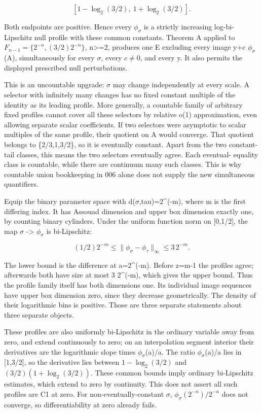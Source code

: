\documentclass[
  11pt,
]{article}
\theoremstyle{remark}\newtheorem{remark}[theorem]{Remark}
\begin{document}
\[
[1-\log_2(3/2),\ 1+\log_2(3/2)].
\]

Both endpoints are positive. Hence every \(\phi_\sigma\) is a strictly
increasing log-bi-Lipschitz null profile with these common constants.
Theorem A applied to \(F_{n-1}=\{2^{-n},(3/2)2^{-n}\}\),
n\textgreater=2, produces one E excluding every image y+c
\(\phi_\sigma\)(A), simultaneously for every \(\sigma\), every
\(c\ne0\), and every y. It also permits the displayed prescribed null
perturbations.

This is an uncountable upgrade: \(\sigma\) may change independently at
every scale. A selector with infinitely many changes has no fixed
constant multiple of the identity as its leading profile. More
generally, a countable family of arbitrary fixed profiles cannot cover
all these selectors by relative o(1) approximation, even allowing
separate scalar coefficients. If two selectors were asymptotic to scalar
multiples of the same profile, their quotient on A would converge. That
quotient belongs to \{2/3,1,3/2\}, so it is eventually constant. Apart
from the two constant-tail classes, this means the two selectors
eventually agree. Each eventual- equality class is countable, while
there are continuum many such classes. This is why countable union
bookkeeping in 006 alone does not supply the new simultaneous
quantifiers.

Equip the binary parameter space with d(\(\sigma\),tau)=2\^{}(-m), where
m is the first differing index. It has Assouad dimension and upper box
dimension exactly one, by counting binary cylinders. Under the uniform
function norm on {[}0,1/2{]}, the map \(\sigma\) -\textgreater{}
\(\phi_\sigma\) is bi-Lipschitz:

\[
(1/2)2^{-m}\le\|\phi_\sigma-\phi_\tau\|_\infty\le3\,2^{-m}.
\]

The lower bound is the difference at a=2\^{}(-m). Before z=m-1 the
profiles agree; afterwards both have size at most 3 2\^{}(-m), which
gives the upper bound. Thus the profile family itself has both
dimensions one. Its individual image sequences have upper box dimension
zero, since they decrease geometrically. The density of their
logarithmic bins is positive. Those are three separate statements about
three separate objects.

These profiles are also uniformly bi-Lipschitz in the ordinary variable
away from zero, and extend continuously to zero; on an interpolation
segment interior their derivatives are the logarithmic slope times
\(\phi_\sigma\)(a)/a. The ratio \(\phi_\sigma\)(a)/a lies in
{[}1,3/2{]}, so the derivative lies between \(1-\log_2(3/2)\) and
\((3/2)(1+\log_2(3/2))\). These common bounds imply ordinary
bi-Lipschitz estimates, which extend to zero by continuity. This does
not assert all such profiles are C1 at zero. For non-eventually-constant
\(\sigma\), \(\phi_\sigma(2^{-n})/2^{-n}\) does not converge, so
differentiability at zero already fails.
\end{document}
